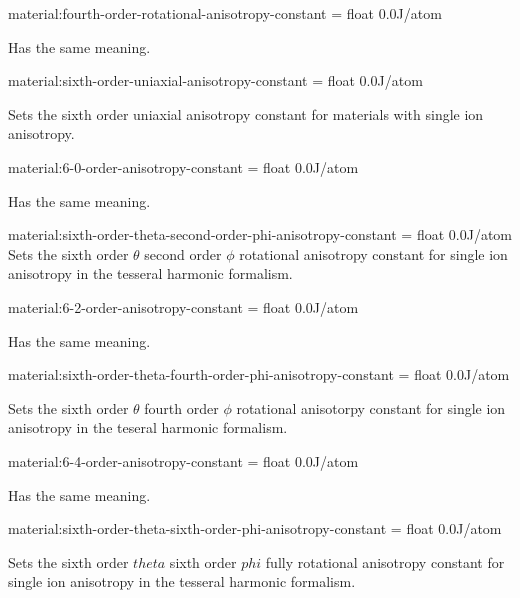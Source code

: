 {\zicf material:fourth-order-rotational-anisotropy-constant = float 0.0\newline J/atom} Has the same meaning.

{\zicf material:sixth-order-uniaxial-anisotropy-constant = float 0.0\newline J/atom} Sets the sixth order uniaxial anisotropy constant for materials with single ion anisotropy.

{\zicf material:6-0-order-anisotropy-constant = float 0.0\newline J/atom} Has the same meaning.

{\zicf material:sixth-order-theta-second-order-phi-anisotropy-constant = float 0.0\newline J/atom} Sets the sixth order $\theta$ second order $\phi$ rotational anisotropy constant for single ion anisotropy in the tesseral harmonic formalism.

{\zicf material:6-2-order-anisotropy-constant = float 0.0\newline J/atom} Has the same meaning.

{\zicf material:sixth-order-theta-fourth-order-phi-anisotropy-constant = float 0.0\newline J/atom} Sets the sixth order $\theta$ fourth order $\phi$ rotational anisotorpy constant for single ion anisotropy in the teseral harmonic formalism.

{\zicf material:6-4-order-anisotropy-constant = float 0.0\newline J/atom} Has the same meaning.

{\zicf material:sixth-order-theta-sixth-order-phi-anisotropy-constant = float 0.0\newline J/atom} Sets the sixth order $theta$ sixth order $phi$ fully rotational anisotropy constant for single ion anisotropy in the tesseral harmonic formalism.

